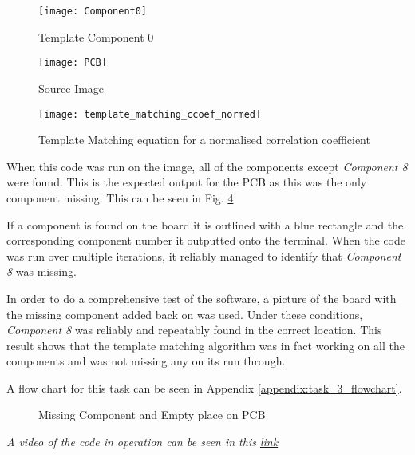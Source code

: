 \documentclass[conference]{IEEEtran}
\begin{document}
\begin{figure}[h]
\centerline{\texttt{[image: Component0]}}
\caption{Template Component 0}
\label{fig:Component0}
\end{figure}

\begin{figure}[h]
\centerline{\texttt{[image: PCB]}}
\caption{Source Image }
\label{fig:PCB}
\end{figure}

\begin{figure}[H]
\centerline{\texttt{[image: template\_matching\_ccoef\_normed]}}
\caption{Template Matching equation for a normalised correlation coefficient}
\label{fig:template_matching_ccoef_normed}
\end{figure}

When this code was run on the image, all of the components except \textit{Component 8} were found. This is the expected output for the PCB as this was the only component missing. This can be seen in Fig. \ref{fig:Missing_component_and_empty_place_on_PCB}.

If a component is found on the board it is outlined with a blue rectangle and the corresponding component number it outputted onto the terminal. When the code was run over multiple iterations, it reliably managed to identify that \textit{Component 8} was missing. 

In order to do a comprehensive test of the software, a picture of the board with the missing component added back on was used. Under these conditions, \textit{Component 8} was reliably and repeatably found in the correct location. This result shows that the template matching algorithm was in fact working on all the components and was not missing any on its run through. 

A flow chart for this task can be seen in Appendix \ref{appendix:task_3_flowchart}.

\begin{figure}
\centering
{}
\caption{Missing Component and Empty place on PCB}
\label{fig:Missing_component_and_empty_place_on_PCB}
\end{figure} 

\textit{A video of the code in operation can be seen in this \href{https://youtu.be/8uITJsA60Wk}{link}}
\end{document}
